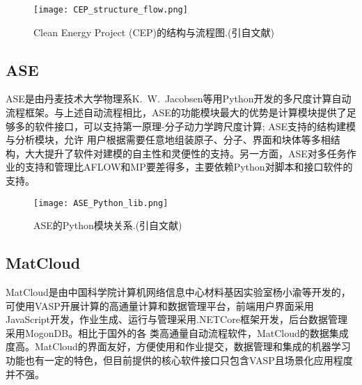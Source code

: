 \begin{figure}[h!]
\centering
\texttt{[image: CEP\_structure\_flow.png]}%
\caption{\textrm{Clean Energy Project (CEP)}的结构与流程图.(引自文献)}
\label{Auto_Flow_Platform-4}
\end{figure}

\subsection{\rm{ASE}}
\textrm{ASE}是由丹麦技术大学物理系\textrm{K.~W.~Jacobsen}等用\textrm{Python}开发的多尺度计算自动流程框架\cite{JPCM29-273002_2017}。与上述自动流程相比，\textrm{ASE}的功能模块最大的优势是计算模块提供了足够多的软件接口，可以支持第一原理-分子动力学跨尺度计算; \textrm{ASE}支持的结构建模与分析模块，允许 用户根据需要任意地组装原子、分子、界面和块体等多相结构，大大提升了软件对建模的自主性和灵便性的支持。另一方面，\textrm{ASE}对多任务作业的支持和管理比\textrm{AFLOW}和\textrm{MP}要差得多，主要依赖\textrm{Python}对脚本和接口软件的支持。
\begin{figure}[h!]
\centering
\texttt{[image: ASE\_Python\_lib.png]}%
\caption{\textrm{ASE}的\textrm{Python}模块关系.(引自文献)}
\label{Auto_Flow_Platform-5}
\end{figure}

\subsection{\rm{MatCloud}}
\textrm{MatCloud}是由中国科学院计算机网络信息中心材料基因实验室杨小渝等开发的，可使用\textrm{VASP}开展计算的高通量计算和数据管理平台\cite{CMS146-319_2018}，前端用户界面采用\textrm{JavaScript}开发，作业生成、运行与管理采用\textrm{.NETCore}框架开发，后台数据管理采用\textrm{MogonDB}。相比于国外的各 类高通量自动流程软件，\textrm{MatCloud}的数据集成度高。\textrm{MatCloud}的界面友好，方便使用和作业提交，数据管理和集成的机器学习功能也有一定的特色，但目前提供的核心软件接口只包含\textrm{VASP}且场景化应用程度并不强。

